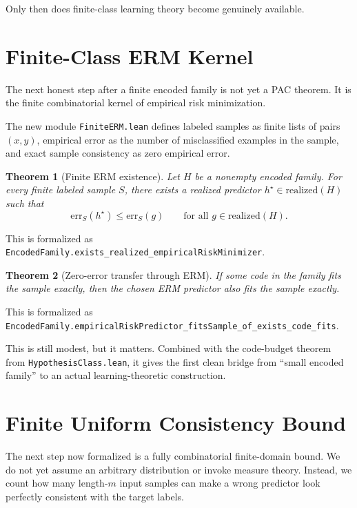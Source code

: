 \documentclass[11pt]{article}
\newtheorem{theorem}{Theorem}[section]
\theoremstyle{remark}
\begin{document}
Only then does finite-class learning theory become genuinely available.

\section{Finite-Class ERM Kernel}

The next honest step after a finite encoded family is not yet a PAC theorem.
It is the finite combinatorial kernel of empirical risk minimization.

The new module \texttt{FiniteERM.lean} defines labeled samples as finite lists of
pairs \((x,y)\), empirical error as the number of misclassified examples in the
sample, and exact sample consistency as zero empirical error.

\begin{theorem}[Finite ERM existence]
Let \(H\) be a nonempty encoded family.  For every finite labeled sample \(S\),
there exists a realized predictor \(h^\star \in \mathrm{realized}(H)\) such that
\[
  \mathrm{err}_S(h^\star) \le \mathrm{err}_S(g)
  \qquad
  \text{for all } g \in \mathrm{realized}(H).
\]
\end{theorem}

\noindent
This is formalized as
\texttt{EncodedFamily.exists\_realized\_empiricalRiskMinimizer}.

\begin{theorem}[Zero-error transfer through ERM]
If some code in the family fits the sample exactly, then the chosen ERM
predictor also fits the sample exactly.
\end{theorem}

\noindent
This is formalized as
\texttt{EncodedFamily.empiricalRiskPredictor\_fitsSample\_of\_exists\_code\_fits}.

This is still modest, but it matters.  Combined with the code-budget theorem
from \texttt{HypothesisClass.lean}, it gives the first clean bridge from
``small encoded family'' to an actual learning-theoretic construction.

\section{Finite Uniform Consistency Bound}

The next step now formalized is a fully combinatorial finite-domain bound.  We
do not yet assume an arbitrary distribution or invoke measure theory.  Instead,
we count how many length-\(m\) input samples can make a wrong predictor look
perfectly consistent with the target labels.
\end{document}
